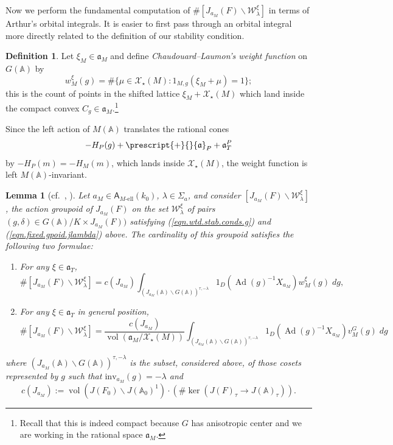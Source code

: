 \documentclass[openany]{amsbook}
\newtheorem{lemma}[theorem]{Lemma}
\theoremstyle{definition}
\newtheorem{definition}[theorem]{Definition}
\theoremstyle{remark}
\numberwithin{equation}{section}
\newcommand{\cX}{\mathcal{X}}
\newcommand{\A}{\mathbb{A}}
\newcommand{\vol}{\operatorname{vol}}
\renewcommand{\-}{\operatorname{-}}
\renewcommand{\a}{\mathfrak{a}}
\newcommand{\on}[1]{\operatorname{#1}}
\renewcommand{\A}{\mathbb{A}}
\newcommand{\el}{\text{-ell}}
\newcommand{\bA}{\mathsf{A}}
\newcommand{\bAe}[1]{\bA_{#1\el}}
\newcommand{\obtcone}{\prescript{+}{}{\a}}
\newcommand{\Ad}{\on{Ad}}
\newcommand{\inv}{\mathrm{inv}}
\begin{document}
Now we perform the fundamental computation of $\# [J_{a_M}(F) \backslash \mathcal{W}^\xi_\lambda]$ in terms of Arthur's orbital integrals. It is easier to first pass through an orbital integral more directly related to the definition of our stability condition. 

\begin{definition}\label{def.weights.CL}
Let $\xi_M \in \a_M$ and define \emph{Chaudouard--Laumon's weight function} on $G(\A)$ by
$$
    w^\xi_M(g) = \# \{\mu \in \cX_\star(M) : 1_{M,g}(\xi_M + \mu) = 1\};
$$
this is the count of points in the shifted lattice $\xi_M + \cX_\star(M)$ which land inside the compact convex $C_g \in \a_M$.\footnote{Recall that this is indeed compact because $G$ has anisotropic center and we are working in the rational space $\a_M$.}
\end{definition}

Since the left action of $M(\A)$ translates the rational cones $$-H_P(g) + \obtcone_P + \a_T^P$$
by $-H_P(m) = -H_M(m)$, which lands inside $\cX_\star(M)$, the weight function is left $M(\A)$-invariant. 

\begin{lemma}[{cf.\ \cite[Proposition 12.2.2]{CLII}, \cite[Corollaire 12.2.4]{CLII}}]\label{lem.gpoid.orb.integral}
    Let $a_M \in \bAe{M}(k_0)$, $\lambda \in \Sigma_a$, and consider $[J_{a_M}(F) \backslash \mathcal{W}^\xi_\lambda]$, the action groupoid of $J_{a_M}(F)$ on the set $\mathcal{W}^\xi_\lambda$ of pairs $(g, \delta) \in G(\A)/K \times J_{a_M}(F))$ satisfying (\ref{eqn.wtd.stab.conds.g}) and (\ref{eqn.fixed.gpoid.jlambda}) above. The cardinality of this groupoid satisfies the following two formulae:
    \begin{enumerate}
        \item For any $\xi \in \a_T$, $$\# [J_{a_M}(F) \backslash \mathcal{W}^\xi_\lambda] = c(J_{a_M}) \int_{(J_{a_M}(\A) \backslash G(\A))^{\tau,-\lambda}} 1_D(\Ad(g)^{-1} X_{a_M}) w_M^\xi(g) \; dg,$$
        \item For any $\xi \in \a_T$ in general position, $$\# [J_{a_M}(F) \backslash \mathcal{W}^\xi_\lambda] = \frac{c(J_{a_M})}{\vol(\a_M/\cX_\star(M))} \int_{(J_{a_M}(\A) \backslash G(\A))^{\tau,-\lambda}} 1_D(\Ad(g)^{-1} X_{a_M}) v_M^G(g) \; dg$$
    \end{enumerate}
    where $(J_{a_M}(\A) \backslash G(\A))^{\tau,-\lambda}$ is the subset, considered above, of those cosets represented by $g$ such that $\inv_{a_M}(g) = -\lambda$ and
    \begin{equation}\label{eqn.def.of.cJ}
        c(J_{a_M}) := \vol(J(F_0) \backslash J(\A_0)^1) \cdot (\#\ker(J(F)_{\tau} \to J(\A)_{\tau})).
    \end{equation}
\end{lemma}
\end{document}
